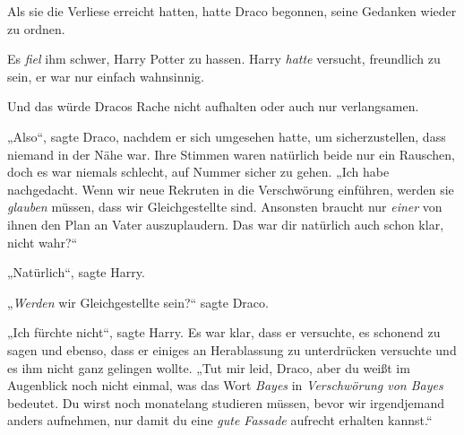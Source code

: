 Als sie die Verliese erreicht hatten, hatte Draco begonnen, seine Gedanken wieder zu ordnen.

Es \emph{fiel} ihm schwer, Harry Potter zu hassen. Harry \emph{hatte} versucht, freundlich zu sein, er war nur einfach wahnsinnig.

Und das würde Dracos Rache nicht aufhalten oder auch nur verlangsamen.

„Also“, sagte Draco, nachdem er sich umgesehen hatte, um sicherzustellen, dass niemand in der Nähe war. Ihre Stimmen waren natürlich beide nur ein Rauschen, doch es war niemals schlecht, auf Nummer sicher zu gehen. „Ich habe nachgedacht. Wenn wir neue Rekruten in die Verschwörung einführen, werden sie \emph{glauben} müssen, dass wir Gleichgestellte sind. Ansonsten braucht nur \emph{einer} von ihnen den Plan an Vater auszuplaudern. Das war dir natürlich auch schon klar, nicht wahr?“

„Natürlich“, sagte Harry.

„\emph{Werden} wir Gleichgestellte sein?“ sagte Draco.

„Ich fürchte nicht“, sagte Harry. Es war klar, dass er versuchte, es schonend zu sagen und ebenso, dass er einiges an Herablassung zu unterdrücken versuchte und es ihm nicht ganz gelingen wollte. „Tut mir leid, Draco, aber du weißt im Augenblick noch nicht einmal, was das Wort \emph{Bayes} in \emph{Verschwörung von Bayes} bedeutet. Du wirst noch monatelang studieren müssen, bevor wir irgendjemand anders aufnehmen, nur damit du eine \emph{gute Fassade} aufrecht erhalten kannst.“


